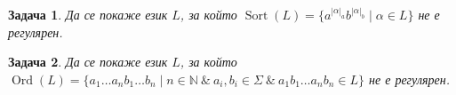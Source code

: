 \documentclass{article}
\newtheorem{problem}{Задача}[section]
\theoremstyle{definition}
\begin{document}
\begin{problem}
Да се покаже език $L$, за който $\operatorname{Sort}(L) = \{ a^{|\alpha|_a} b^{|\alpha|_b} \mid \alpha \in L \}$ не е регулярен.
\end{problem}

\begin{problem}
Да се покаже език $L$, за който $\operatorname{Ord}(L) = \{ a_1 \dots a_n b_1 \dots b_n \mid n \in \mathbb{N} \: \& \: a_i, b_i \in \Sigma \: \& \: a_1 b_1 \dots a_n b_n \in L \}$ не е регулярен.
\end{problem}
\end{document}
